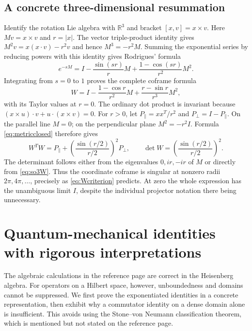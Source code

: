 \documentclass[11pt]{article}
\numberwithin{equation}{section}
\theoremstyle{definition}
\theoremstyle{remark}
\newcommand{\R}{\mathbb{R}}
\begin{document}
\subsection{A concrete three-dimensional resummation}
Identify the rotation Lie algebra with $\R^3$ and bracket
$[x,v]=x\times v$. Here $M v=x\times v$ and $r=|x|$.
The vector triple-product identity gives
$M^2v=x(x\cdot v)-r^2v$ and hence $M^3=-r^2M$.
Summing the exponential series by reducing powers with this
identity gives Rodrigues' formula
\[
 e^{-sM}=I-\frac{\sin(sr)}rM+
              \frac{1-\cos(sr)}{r^2}M^2.
\]
Integrating from $s=0$ to $1$ proves the complete coframe formula
\begin{equation}\label{eq:so3W}
 W=I-\frac{1-\cos r}{r^2}M+
          \frac{r-\sin r}{r^3}M^2,
\end{equation}
with its Taylor values at $r=0$.
The ordinary dot product is invariant because
$(x\times u)\cdot v+u\cdot(x\times v)=0$. For $r>0$, let
$P_\parallel=xx^T/r^2$ and $P_\perp=I-P_\parallel$.
On the parallel line $M=0$; on the perpendicular plane
$M^2=-r^2I$. Formula \eqref{eq:metricclosed} therefore gives
\begin{equation}\label{eq:so3metric}
 W^TW=P_\parallel+
       \left(\frac{\sin(r/2)}{r/2}\right)^2P_\perp,
 \qquad
 \det W=\left(\frac{\sin(r/2)}{r/2}\right)^2.
\end{equation}
The determinant follows either from the eigenvalues $0,ir,-ir$
of $M$ or directly from \eqref{eq:so3W}. Thus the coordinate
coframe is singular at nonzero radii $2\pi,4\pi,\ldots$, precisely
as \eqref{eq:Wcriterion} predicts. At zero the whole expression
has the unambiguous limit $I$, despite the individual projector
notation there being unnecessary.

\section{Quantum-mechanical identities with rigorous interpretations}
\label{sec:quantum}
The algebraic calculations in the reference page are correct in the
Heisenberg algebra. For operators on a Hilbert space, however,
unboundedness and domains cannot be suppressed. We first prove the
exponentiated identities in a concrete representation, then exhibit
why a commutator identity on a dense domain alone is insufficient.
This avoids using the Stone--von Neumann classification theorem,
which is mentioned but not stated on the reference page.
\end{document}
